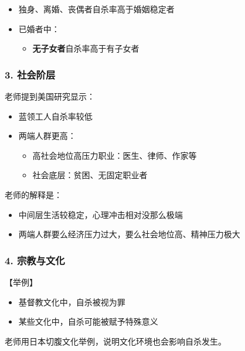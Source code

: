 \documentclass[
  chinese,
  9pt,
  a4paper,
]{ctexart}
\providecommand{\tightlist}{%
  \setlength{\itemsep}{0pt}\setlength{\parskip}{0pt}}
\begin{document}
\begin{itemize}
\item
  独身、离婚、丧偶者自杀率高于婚姻稳定者
\item
  已婚者中：

  \begin{itemize}
  \tightlist
  \item
    \textbf{无子女者}自杀率高于有子女者
  \end{itemize}
\end{itemize}

\subsubsection{3. 社会阶层}\label{ux793eux4f1aux9636ux5c42}

老师提到美国研究显示：

\begin{itemize}
\item
  蓝领工人自杀率较低
\item
  两端人群更高：

  \begin{itemize}
  \tightlist
  \item
    高社会地位高压力职业：医生、律师、作家等
  \item
    社会底层：贫困、无固定职业者
  \end{itemize}
\end{itemize}

老师的解释是：

\begin{itemize}
\tightlist
\item
  中间层生活较稳定，心理冲击相对没那么极端
\item
  两端人群要么经济压力过大，要么社会地位高、精神压力极大
\end{itemize}

\subsubsection{4. 宗教与文化}\label{ux5b97ux6559ux4e0eux6587ux5316}

【举例】

\begin{itemize}
\tightlist
\item
  基督教文化中，自杀被视为罪
\item
  某些文化中，自杀可能被赋予特殊意义
\end{itemize}

老师用日本切腹文化举例，说明文化环境也会影响自杀发生。
\end{document}

